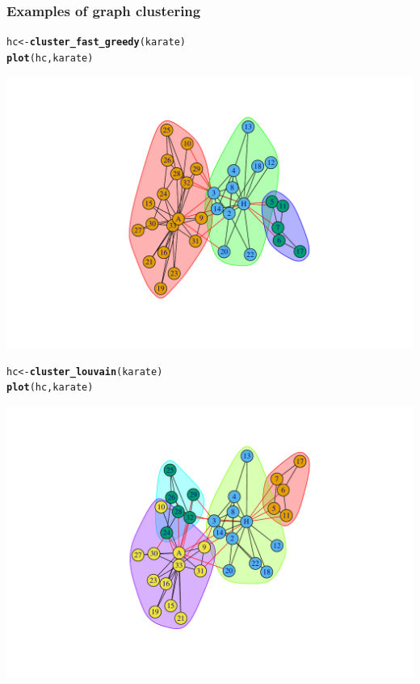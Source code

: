\documentclass{beamer}\usepackage[]{graphicx}\usepackage[]{color}
\makeatletter
\newcommand{\hlstd}[1]{\textcolor[rgb]{0.345,0.345,0.345}{#1}}%
\newcommand{\hlkwb}[1]{\textcolor[rgb]{0.69,0.353,0.396}{#1}}%
\newcommand{\hlkwd}[1]{\textcolor[rgb]{0.737,0.353,0.396}{\textbf{#1}}}%
\newenvironment{kframe}{%
 \def\at@end@of@kframe{}%
 \ifinner\ifhmode%
  \def\at@end@of@kframe{\end{minipage}}%
  \begin{minipage}{\columnwidth}%
 \fi\fi%
 \def\FrameCommand##1{\hskip\@totalleftmargin \hskip-\fboxsep
 \colorbox{shadecolor}{##1}\hskip-\fboxsep
     \hskip-\linewidth \hskip-\@totalleftmargin \hskip\columnwidth}%
 \MakeFramed {\advance\hsize-\width
   \@totalleftmargin\z@ \linewidth\hsize
   \@setminipage}}%
 {\par\unskip\endMakeFramed%
 \at@end@of@kframe}
\newenvironment{knitrout}{}{} %
\makeatother
\begin{document}
\begin{frame}
  \frametitle{Examples of graph clustering}

\begin{knitrout}\scriptsize
{}\color{fgcolor}\begin{kframe}
\begin{alltt}
\hlstd{hc} \hlkwb{<-} \hlkwd{cluster_fast_greedy}\hlstd{(karate)}
\hlkwd{plot}\hlstd{(hc,karate)}
\end{alltt}
\end{kframe}
\includegraphics[width=.8\textwidth]{figures/unnamed-chunk-1-1} 

\end{knitrout}

\begin{knitrout}\scriptsize
{}\color{fgcolor}\begin{kframe}
\begin{alltt}
\hlstd{hc} \hlkwb{<-} \hlkwd{cluster_louvain}\hlstd{(karate)}
\hlkwd{plot}\hlstd{(hc,karate)}
\end{alltt}
\end{kframe}
\includegraphics[width=.8\textwidth]{figures/unnamed-chunk-2-1} 


\end{knitrout}
\end{frame}
\end{document}
